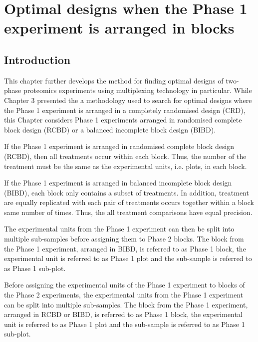 \chapter{Optimal designs when the Phase 1 experiment is arranged in blocks}

\section{Introduction}
\label{sec:intro}
This chapter further develops the method for finding optimal designs of two-phase proteomics experiments using multiplexing technology in particular. While Chapter 3 presented the a methodology used to search for optimal designs where the Phase 1 experiment is arranged in a completely randomised design (CRD), this Chapter considers Phase 1 experiments arranged in randomised complete block design (RCBD) or a balanced incomplete block design (BIBD). 


If the Phase 1 experiment is arranged in randomised complete block design (RCBD), then all treatments occur within each block. Thus, the number of the treatment must be the same as the experimental units, i.e. plots, in each block. 

If the Phase 1 experiment is arranged in balanced incomplete block design (BIBD), each block only contains a subset of treatments. In addition, treatment are equally replicated with each pair of treatments occurs together within a block same number of times. Thus, the all treatment comparisons have equal precision. 

The experimental units from the Phase 1 experiment can then be split into multiple sub-samples before assigning them to Phase 2 blocks. The block from the Phase 1 experiment, arranged in BIBD, is referred to as Phase 1 block, the experimental unit is referred to as Phase 1 plot and the sub-sample is referred to as Phase 1 sub-plot.

Before assigning the experimental units of the Phase 1 experiment to blocks of the Phase 2 experiments, the experimental units from the Phase 1 experiment can be split into multiple sub-samples. The block from the Phase 1 experiment, arranged in RCBD or BIBD, is referred to as Phase 1 block, the experimental unit is referred to as Phase 1 plot and the sub-sample is referred to as Phase 1 sub-plot.





